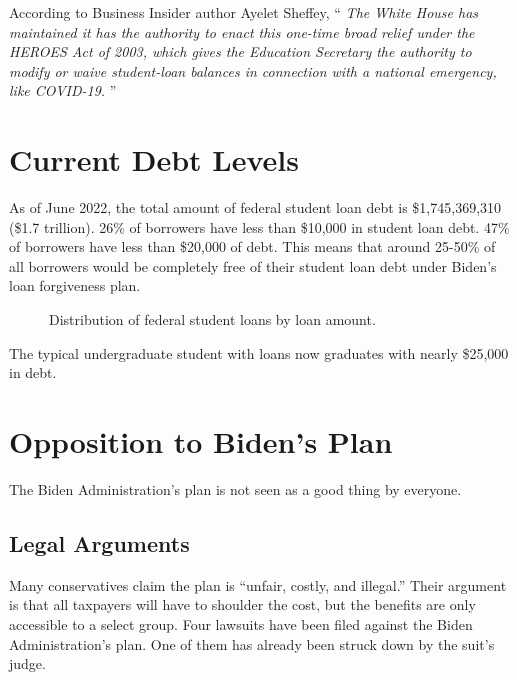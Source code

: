 \documentclass{../khw}
\begin{document}
According to Business Insider author Ayelet Sheffey,
``\textit{%
    The White House has maintained it has the authority to enact this one-time broad
    relief under the HEROES Act of 2003, which gives the Education Secretary the
    authority to modify or waive student-loan balances in connection with a national
    emergency, like COVID-19.%
}''

\section{Current Debt Levels}



As of June 2022, the total amount of federal student loan debt is
\$1,745,369,310 (\$1.7 trillion). 26\% of borrowers have less than \$10,000 in
student loan debt. 47\% of borrowers have less than \$20,000 of debt. This means
that around 25-50\% of all borrowers would be completely free of their student
loan debt under Biden's loan forgiveness plan.

\begin{figure}[h]
    \centering%
    \caption{Distribution of federal student loans by loan amount.}
    \label{fig:loandist}%
\end{figure}

The typical undergraduate student with loans now graduates with nearly \$25,000
in debt.

\section{Opposition to Biden's Plan}

The Biden Administration's plan is not seen as a good thing by everyone.

\subsection{Legal Arguments}

Many conservatives claim the plan is “unfair, costly, and illegal.” Their
argument is that all taxpayers will have to shoulder the cost, but the benefits
are only accessible to a select group. Four lawsuits have been filed against the
Biden Administration's plan. One of them has already been struck down by the
suit's judge.
\end{document}
